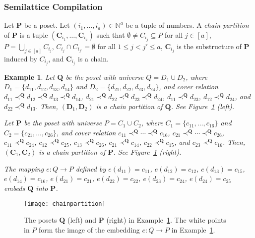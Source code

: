 \documentclass[usletter]{article}
\newcommand{\longversion}[1]{#1}
\newcommand{\shortversion}[1]{}
\newcommand{\longshort}[2]{\longversion{#1}\shortversion{#2}}
\newcommand{\cc}{\mathbf{C}}
\newcommand{\dd}{\mathbf{D}}
\newcommand{\pp}{\mathbf{P}}
\newcommand{\qq}{\mathbf{Q}}
\newtheorem{example}{Example}
\begin{document}
\newcommand{\exchainpartition}[0]{
\begin{example}\label{ex:chainpartition}
Let $\qq$ be the poset with universe $Q=D_1 \cup D_2$, 
where $D_1=\{ d_{11},d_{12},d_{13},d_{14}\}$ and $D_2=\{ d_{21},d_{22},d_{23},d_{24}\}$, 
and cover relation $d_{11} \prec^{\qq} d_{12} \prec^{\qq} d_{13} \prec^{\qq} d_{14}$, 
$d_{21} \prec^{\qq} d_{22} \prec^{\qq} d_{23} \prec^{\qq} d_{24}$, 
$d_{11} \prec^{\qq} d_{23}$,
$d_{12} \prec^{\qq} d_{24}$, and  
$d_{22} \prec^{\qq} d_{13}$.  Then, 
$(\dd_1,\dd_2)$ is a chain partition of $\qq$.  See Figure~\ref{fig:chainpartition} (left).

Let $\pp$ be the poset with universe $P=C_1 \cup C_2$, 
where $C_1=\{ c_{11},\ldots,c_{16}\}$ and $C_2=\{ c_{21},\ldots,c_{26}\}$, 
and cover relation $c_{11} \prec^{\qq} \cdots \prec^{\qq} c_{16}$,
$c_{21} \prec^{\qq} \cdots \prec^{\qq} c_{26}$, 
$c_{11} \prec^{\qq} c_{24}$, 
$c_{12} \prec^{\qq} c_{25}$, 
$c_{13} \prec^{\qq} c_{26}$, 
$c_{21} \prec^{\qq} c_{14}$, 
$c_{22} \prec^{\qq} c_{15}$, and 
$c_{23} \prec^{\qq} c_{16}$.  Then, 
$(\cc_1,\cc_2)$ is a chain partition of $\pp$.  See Figure~\ref{fig:chainpartition} (right).

The mapping $e \colon Q \to P$ defined by 
$e(d_{11})=c_{11}$,
$e(d_{12})=c_{12}$,
$e(d_{13})=c_{15}$, 
$e(d_{14})=c_{16}$, 
$e(d_{21})=c_{21}$, 
$e(d_{22})=c_{22}$, 
$e(d_{23})=c_{24}$, 
$e(d_{24})=c_{25}$ embeds $\qq$ into $\pp$.
\end{example}

\begin{figure}[h]
\centering
\texttt{[image: chainpartition]}
\caption{The posets $\qq$ (left) and $\pp$ (right) in Example~\ref{ex:chainpartition}.   
The white points in $P$ form the image of the embedding $e \colon Q \to P$ in Example~\ref{ex:chainpartition}.}
\label{fig:chainpartition}
\end{figure}  
}

\subsubsection{Semilattice Compilation}\label{sect:compil}
Let $\pp$ be a poset.  Let $(i_1,\ldots,i_a) \in \mathbb{N}^a$ 
be a tuple of numbers.  A \emph{chain partition} of $\pp$ is a tuple $(\cc_{i_1},\ldots,\cc_{i_a})$ 
such that $\emptyset \neq C_{i_j} \subseteq P$ for all $j \in [a]$, 
$P=\bigcup_{j \in [a]}C_{i_j}$, $C_{i_j} \cap C_{i_{j'}}=\emptyset$ for all $1 \leq j<j' \leq a$, 
$\cc_{i_j}$ is the substructure of $\pp$ induced by $C_{i_j}$, 
and $\cc_{i_j}$ is a chain.  \longshort{\exchainpartition}{\exchainpartition}
\end{document}
